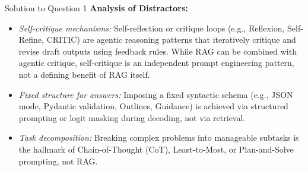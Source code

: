 \documentclass[11pt,a4paper]{article}
\begin{document}
\begin{solutionbox}{Solution to Question 1}
\medskip
\textbf{Analysis of Distractors:}
\begin{itemize}[leftmargin=1.5cm]
    \item[\textbf{(a)}] \textit{Self-critique mechanisms:} Self-reflection or critique loops (e.g., Reflexion, Self-Refine, CRITIC) are agentic reasoning patterns that iteratively critique and revise draft outputs using feedback rules. While RAG can be combined with agentic critique, self-critique is an independent prompt engineering pattern, not a defining benefit of RAG itself.
    \item[\textbf{(d)}] \textit{Fixed structure for answers:} Imposing a fixed syntactic schema (e.g., JSON mode, Pydantic validation, Outlines, Guidance) is achieved via structured prompting or logit masking during decoding, not via retrieval.
    \item[\textbf{(e)}] \textit{Task decomposition:} Breaking complex problems into manageable subtasks is the hallmark of Chain-of-Thought (CoT), Least-to-Most, or Plan-and-Solve prompting, not RAG.
\end{itemize}
\end{solutionbox}

\bigskip
\end{document}

